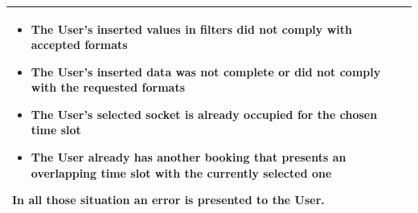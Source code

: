 \documentclass[11pt]{article}
\begin{document}
\begin{description}
\begin{table}[H]
\begin{tabularx}{\textwidth}{|>{\hsize=0.5\hsize}X|>{\hsize=1.5\hsize}X|}
                \begin{minipage}[t]{\hsize}
                \vspace{0pt}
                \begin{itemize}[topsep=0pt, leftmargin=*]
                    \item The User's inserted values in filters did not comply with accepted formats
                    \item The User's inserted data was not complete or did not comply with the requested formats
                    \item The User's selected socket is already occupied for the chosen time slot
                    \item The User already has another booking that presents an overlapping time slot with the currently selected one
                \end{itemize}
                \vspace{8pt}
                \end{minipage}
                In all those situation an error is presented to the User.
                \vspace{6pt}
            \\
            \hline
        \end{tabularx}
    \end{table}
    

\end{description}
\end{document}
